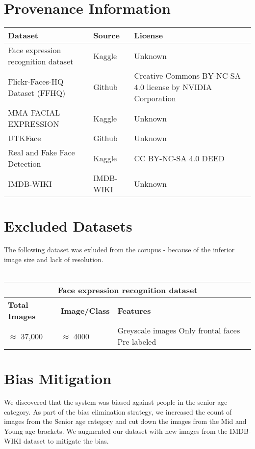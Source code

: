 \section{Provenance Information}
    \begin{tabular}{ |p{3cm}||p{3cm} ||p{3cm} | }
        \hline
        \textbf{Dataset} & \textbf{Source} & \textbf{License}\\
        \hline
        Face expression recognition dataset & Kaggle \cite{KaggleDataset} & Unknown\\
        \hline
        Flickr-Faces-HQ Dataset (FFHQ) & Github \cite{FFHQ} & Creative Commons BY-NC-SA 4.0 license by NVIDIA Corporation \cite{CreativeCommonsBY-NC2.0}\\
        \hline
        MMA FACIAL EXPRESSION & Kaggle \cite{MMAKaggleDataset} & Unknown\\
        \hline
        UTKFace & Github \cite{UTKFace} & Unknown\\
        \hline
        Real and Fake Face Detection & Kaggle \cite{RealFakeKaggle} & CC BY-NC-SA 4.0 DEED\cite{CC-BY-NC-SA4.0-DEED}\\
        \hline
        IMDB-WIKI & IMDB-WIKI \cite{IMDBWiki} & Unknown\\
        \hline
    \end{tabular}

\section{Excluded Datasets}
\noindent The following dataset was exluded from the corupus - because of the inferior image size and lack of resolution.\\\\
\begin{tabular}{ |p{3cm}||p{3cm} ||p{3cm} | }
    \hline
    \multicolumn{3}{|c|}{\textbf{Face expression recognition dataset \cite{KaggleDataset}}} \\
    \hline
    \textbf{Total Images} & \textbf{Image/Class } & \textbf{Features}\\
    \hline
    $\approx$ 37,000 & $\approx$ 4000 & Greyscale images Only frontal faces Pre-labeled\\
    \hline
\end{tabular}
\vspace*{1em}
\section{Bias Mitigation}
We discovered that the system was biased against people in the senior age category. As part of the bias elimination strategy, we increased the count of images from the Senior age category and cut down the images from the Mid and Young age brackets. We augmented our dataset with new images from the IMDB-WIKI\cite{IMDBWiki} dataset to mitigate the bias.  
